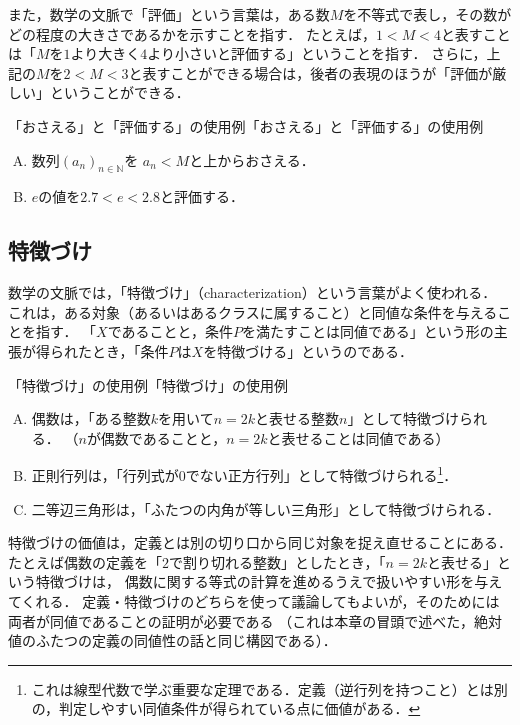 また，数学の文脈で「評価」という言葉は，ある数$M$を不等式で表し，その数がどの程度の大きさであるかを示すことを指す．
たとえば，$ 1 < M <4$と表すことは「$M$を$1$より大きく$4$より小さいと評価する」ということを指す．
さらに，上記の$M$を$ 2< M <3$と表すことができる場合は，後者の表現のほうが「評価が厳しい」ということができる．




\begin{example}{「おさえる」と「評価する」の使用例}{「おさえる」と「評価する」の使用例}
  \begin{enumerate}[(A)]
    \item 数列$(a_n)_{n \in \mathbb{N}}$を $ a_n <M$と上からおさえる．
    \item $e$の値を$2.7 < e < 2.8$と評価する．
  \end{enumerate}
\end{example}


\subsection{特徴づけ}

数学の文脈では，「特徴づけ」（characterization）という言葉がよく使われる．
これは，ある対象（あるいはあるクラスに属すること）と同値な条件を与えることを指す．
「$X$であることと，条件$P$を満たすことは同値である」という形の主張が得られたとき，「条件$P$は$X$を特徴づける」というのである．

\begin{example}{「特徴づけ」の使用例}{「特徴づけ」の使用例}
  \begin{enumerate}[(A)]
    \item 偶数は，「ある整数$k$を用いて$n=2k$と表せる整数$n$」として特徴づけられる．
    （$n$が偶数であることと，$n=2k$と表せることは同値である）
    \item 正則行列は，「行列式が$0$でない正方行列」として特徴づけられる\footnote{これは線型代数で学ぶ重要な定理である．定義（逆行列を持つこと）とは別の，判定しやすい同値条件が得られている点に価値がある．}．
    \item 二等辺三角形は，「ふたつの内角が等しい三角形」として特徴づけられる．
  \end{enumerate}
\end{example}

特徴づけの価値は，定義とは別の切り口から同じ対象を捉え直せることにある．
たとえば偶数の定義を「$2$で割り切れる整数」としたとき，「$n=2k$と表せる」という特徴づけは，
偶数に関する等式の計算を進めるうえで扱いやすい形を与えてくれる．
定義・特徴づけのどちらを使って議論してもよいが，そのためには両者が同値であることの証明が必要である
（これは本章の冒頭で述べた，絶対値のふたつの定義の同値性の話と同じ構図である）．

